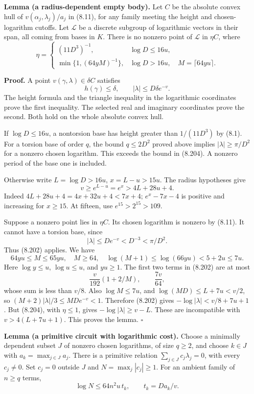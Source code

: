 \documentclass[
  11pt,
  a4paper,
]{article}
\begin{document}
\textbf{Lemma (a radius-dependent empty body).} Let \(C\) be the
absolute convex hull of \(v(\alpha_j,\lambda_j)/a_j\) in (8.11), for any
family meeting the height and chosen-logarithm cutoffs. Let
\(\mathcal L\) be a discrete subgroup of logarithmic vectors in their
span, all coming from bases in \(K\). There is no nonzero point of
\(\mathcal L\) in \(\eta C\), where \[
\eta=
\begin{cases}
(11D^3)^{-1},&\log D\le16u,\\[2mm]
\min\{1,(64yM)^{-1}\},&\log D>16u,\quad M=\lceil64yu\rceil .
\end{cases}
\tag{8.203}
\]

\textbf{Proof.} A point \(v(\gamma,\lambda)\in\delta C\) satisfies \[
h(\gamma)\le\delta,\qquad |\lambda|\le D\delta e^{-v}.
\tag{8.204}
\] The height formula and the triangle inequality in the logarithmic
coordinates prove the first inequality. The selected real and imaginary
coordinates prove the second. Both hold on the whole absolute convex
hull.

If \(\log D\le16u\), a nontorsion base has height greater than
\(1/(11D^3)\) by (8.1). For a torsion base of order \(q\), the bound
\(q\le2D^2\) proved above implies \(|\lambda|\ge\pi/D^2\) for a nonzero
chosen logarithm. This exceeds the bound in (8.204). A nonzero period of
the base one is included.

Otherwise write \(L=\log D>16u\), \(x=L-u>15u\). The radius hypotheses
give \[
v\ge e^{L-u}=e^x>4L+28u+4.
\] Indeed \(4L+28u+4=4x+32u+4<7x+4\); \(e^x-7x-4\) is positive and
increasing for \(x\ge15\). At fifteen, use \(e^{15}>2^{15}>109\).

Suppose a nonzero point lies in \(\eta C\). Its chosen logarithm is
nonzero by (8.11). It cannot have a torsion base, since \[
|\lambda|\le De^{-v}<D^{-3}<\pi/D^2.
\] Thus (8.202) applies. We have \[
64yu\le M\le65yu,\quad M\ge64,\quad
\log(M+1)\le\log(66yu)<5+2u\le7u.
\] Here \(\log y\le u\), \(\log u\le u\), and \(yu\ge1\). The first two
terms in (8.202) are at most \[
\frac v{192}(1+2/M),\qquad \frac{7v}{64},
\] whose sum is less than \(v/8\). Also \(\log M\le7u\), and
\(\log(MD)\le L+7u<v/2\), so \((M+2)|\lambda|/3\le MDe^{-v}<1\).
Therefore (8.202) gives \(-\log|\lambda|<v/8+7u+1\). But (8.204), with
\(\eta\le1\), gives \(-\log|\lambda|\ge v-L\). These are incompatible
with \(v>4(L+7u+1)\). This proves the lemma. \(\square\)

\textbf{Lemma (a primitive circuit with logarithmic cost).} Choose a
minimally dependent subset \(J\) of nonzero chosen logarithms, of size
\(q\ge2\), and choose \(k\in J\) with \(a_k=\max_{j\in J}a_j\). There is
a primitive relation \(\sum_{j\in J}c_j\lambda_j=0\), with every
\(c_j\ne0\). Set \(c_j=0\) outside \(J\) and \(N=\max_j|c_j|\ge1\). For
an ambient family of \(n\ge q\) terms, \[
\log N\le64n^2u\,t_k,\qquad t_k=Da_k/v.
\tag{8.205}
\]
\end{document}

